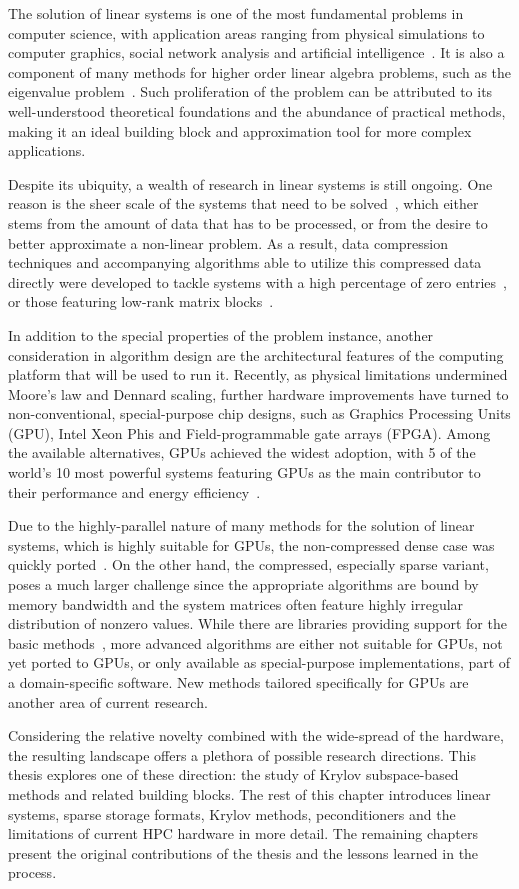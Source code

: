 The solution of linear systems is one of the most fundamental problems in
computer science, with application areas ranging from physical simulations to
computer graphics, social network analysis and artificial
intelligence~\cite{saad,de-boor}. It is also a component of many methods
for higher order linear algebra problems, such as the eigenvalue
problem~\cite{demmel,feast}. Such proliferation of the problem can be attributed
to its well-understood theoretical foundations and the abundance of practical
methods, making it an ideal building block and approximation tool for more
complex applications\cite{demmel,higham}.

Despite its ubiquity, a wealth of research in linear systems is still ongoing.
One reason is the sheer scale of the systems that need to be
solved~\cite{exascale-report}, which either stems from the amount of data that
has to be processed, or from the desire to better approximate a non-linear
problem. As a result, data compression techniques and accompanying algorithms
able to utilize this compressed data directly were developed to tackle
systems with a high percentage of zero
entries~\cite{saad,duff,barrettemplates}, or
those featuring low-rank matrix blocks~\cite{hierarchical}.

In addition to the special properties of the problem instance, another
consideration in algorithm design are the architectural features of the
computing platform that will be used to run it. Recently, as physical
limitations undermined Moore's law and Dennard scaling, further hardware
improvements have turned to non-conventional, special-purpose chip designs, such
as Graphics Processing Units (GPU), Intel Xeon Phis and Field-programmable gate
arrays (FPGA). Among the available alternatives, GPUs achieved the widest
adoption, with 5 of the world's 10 most powerful systems featuring GPUs as the
main contributor to their performance and energy efficiency~\cite{top500}.

Due to the highly-parallel nature of many methods for the solution of linear
systems, which is highly suitable for GPUs, the non-compressed dense case was
quickly ported~\cite{magma}. On the other hand, the compressed, especially
sparse variant, poses a much larger challenge since the appropriate algorithms
are bound by memory bandwidth and the system matrices often feature highly
irregular distribution of nonzero values. While there are libraries providing
support for the basic methods~\cite{magma,vienna-cl,paralution,ginkgo}, more
advanced algorithms are either not suitable for GPUs, not yet ported to GPUs, or
only available as special-purpose implementations, part of a domain-specific
software. New methods tailored specifically for GPUs are another area of current
research.

Considering the relative novelty combined with the wide-spread of the
hardware, the resulting landscape offers a plethora of possible research
directions. This thesis explores one of these direction: the study of Krylov
subspace-based methods and related building blocks. The rest of this chapter
introduces linear systems, sparse storage formats, Krylov methods,
peconditioners and the limitations of current HPC hardware in more detail. The
remaining chapters present the original contributions of the thesis and the
lessons learned in the process.
